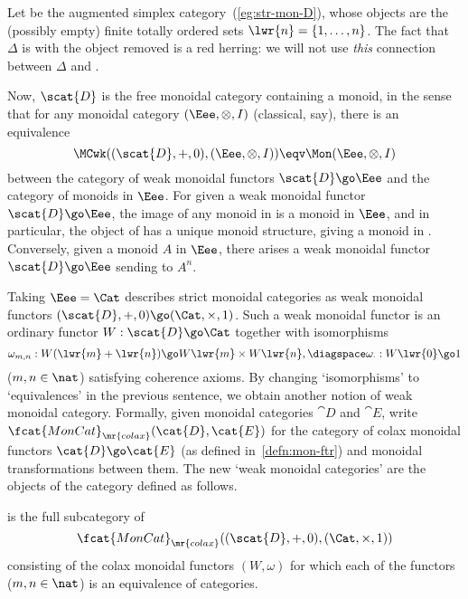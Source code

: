 Let  be the augmented simplex category~(\ref{eg:str-mon-D}), whose
objects are the (possibly empty) finite totally ordered sets $\lwr{n} =
\{1, \ldots, n\}$.  The fact that $\Delta$ is  with the object
 removed is a red herring:%
%
%
%
% 
%
%
we will not use \emph{this} connection
between $\Delta$ and .  

Now, $\scat{D}$ is the free monoidal category containing a monoid,%
%
%
in the
sense that for any monoidal category $(\Eee, \otimes, I)$ (classical, say),
there is an equivalence
\[
\MCwk( (\scat{D},+,0), (\Eee,\otimes,I) )
\eqv
\Mon( \Eee, \otimes, I )
\]
between the category of weak monoidal functors $\scat{D} \go \Eee$ and the
category of monoids in $\Eee$.  For given a weak monoidal functor $\scat{D}
\go \Eee$, the image of any monoid in  is a monoid in $\Eee$, and
in particular, the object  of  has a unique monoid
structure, giving a monoid in \Eee.  Conversely, given a monoid $A$ in
$\Eee$, there arises a weak monoidal functor $\scat{D} \go \Eee$ sending
 to $A^n$.

Taking $\Eee = \Cat$ describes strict monoidal categories as weak monoidal
functors $(\scat{D},+,0) \go (\Cat,\times,1)$.  Such a weak monoidal
functor is an ordinary functor $W: \scat{D} \go \Cat$ together with
isomorphisms
% 
\begin{equation}	\label{eq:colax-coh-maps}
\omega_{m,n}: W(\lwr{m} + \lwr{n}) \go W\lwr{m} \times W\lwr{n},
\diagspace
\omega_\cdot: W\lwr{0} \go 1
\end{equation}
% 
($m, n \in\nat$) satisfying coherence axioms.  By changing `isomorphisms'
to `equivalences' in the previous sentence, we obtain another notion of
weak monoidal category.  Formally, given monoidal categories $\cat{D}$ and
$\cat{E}$, write $\fcat{MonCat}_\mr{colax}(\cat{D}, \cat{E})$ for the
category of colax monoidal functors $\cat{D} \go \cat{E}$ (as defined
in~\ref{defn:mon-ftr}) and monoidal transformations between them.  The new
`weak monoidal categories' are the objects of the category 
defined as follows.
%
\begin{defn}	
 is the full subcategory of
\[
\fcat{MonCat}_\mr{colax}((\scat{D},+,0), (\Cat,\times,1))
\]
consisting of the colax monoidal functors $(W, \omega)$ for which each of
the functors~ ($m, n \in \nat$) is an equivalence
of categories.
\end{defn}


